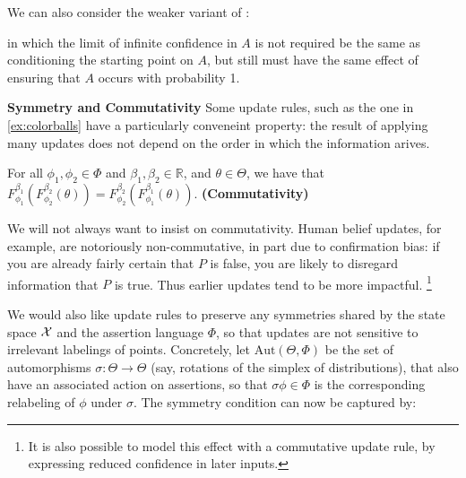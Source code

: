 \documentclass{article}
\begin{document}
We can also consider the weaker variant of :
in which the limit of infinite confidence in $A$ is not required be the same as conditioning the starting point on $A$, but still must have the same effect of ensuring that $A$ occurs with probability 1.


\textbf{Symmetry and Commutativity}
Some update rules, such as the one in \cref{ex:colorballs} have a particularly conveneint property: the result of applying many updates does not depend on the order in which the information arives.

\begin{URaxioms}
    \item For all $\phi_1, \phi_2 \in \Phi$ and $\beta_1, \beta_2 \in \mathbb R$, and
    $\theta \in \Theta$,
    we have that
    $
        F^{\beta_1}_{\phi_1} ( F^{\beta_2}_{\phi_2}(\theta)) =
            F^{\beta_2}_{\phi_2} ( F^{\beta_1}_{\phi_1}(\theta)).
    $
    \hfill\textbf{(Commutativity)} \label{ax:commute}
\end{URaxioms}

We will not always want to insist on commutativity. Human belief updates, for example, are notoriously non-commutative, in part due to confirmation bias:
if you are already fairly certain that $P$ is false, you are likely to disregard
information that $P$ is true. Thus earlier updates tend to be more impactful.%
\footnote{
    It is also possible to model this effect with a commutative update rule,
    by expressing reduced confidence in later inputs.
}


We would also like update rules to preserve any symmetries shared by the state space $\mathcal X$ and the assertion language $\Phi$, so that updates are not sensitive to irrelevant labelings of points.
Concretely, let $\mathrm{Aut}(\Theta, \Phi)$ be the set of automorphisms $\sigma : \Theta \to \Theta$ (say, rotations of the simplex of distributions), that also have an associated action on assertions, so that $\sigma\phi \in \Phi$ is the corresponding relabeling of $\phi$ under $\sigma$.  The symmetry condition can now be captured by:
\end{document}
